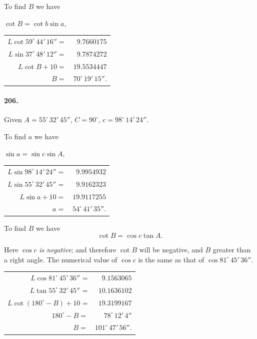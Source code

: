 \documentclass{book}[2004/02/16]
\begin{document}
\begin{mainmatter}
\begin{spacing}{1.3}
To find $B$ we have
\begin{center}
$\cot B = \cot b \sin a,$\\[.1ex]
\begin{tabular}{rr@{}}
$L \cot 59^\circ\, 44'\, 16'' =$ & $ 9.7660175$\\
$L \sin 37^\circ\, 48'\, 12'' =$ & $ 9.7874272$\\
\cline{2-2}
$L \cot B + 10 = $ & $19.5534447$\\
$B =$ & $70^\circ\, 19'\, 15''$.
\end{tabular}
\end{center}

\paragraph{206.}
Given $A = 55^\circ\, 32'\, 45''$, $C = 90^\circ$, $c = 98^\circ\, 14'\, 24''$.

To find $a$ we have
\begin{center}
$\sin a = \sin c \sin A,$\\[.5ex]
\begin{tabular}{rr@{}}
$L \sin 98^\circ\, 14'\, 24'' =$ & $ 9.9954932$ \\
$L \sin 55^\circ\, 32'\, 45'' =$ & $ 9.9162323$ \\
\cline{2-2}
$L \sin a + 10                =$ & $19.9117255$ \\
$a =$ & $54^\circ\, 41'\, 35''$.
\end{tabular}
\end{center}

To find $B$ we have
\[
\cot B = \cos c \tan A.
\]

Here $\cos c$ \textit{is negative}; and therefore $\cot B$ will be negative,
and $B$ greater than a right angle. The numerical value of $\cos c$
is the same as that of $\cos 81^\circ\, 45'\, 36''$.
\begin{center}
\begin{tabular}{rr@{}}
$L \cos 81^\circ\, 45'\, 36''$ = & $ 9.1563065$ \\
$L \tan 55^\circ\, 32'\, 45''$ = & $10.1636102$ \\
\cline{2-2}
$L \cot (180^\circ - B) + 10$  = & $19.3199167$ \\
$180^\circ - B =            $    & $ 78^\circ\, 12'\, 4''$ \\
$            B =            $    & $101^\circ\, 47'\, 56''$.
\end{tabular}
\end{center}


\end{spacing}
\end{mainmatter}
\end{document}
